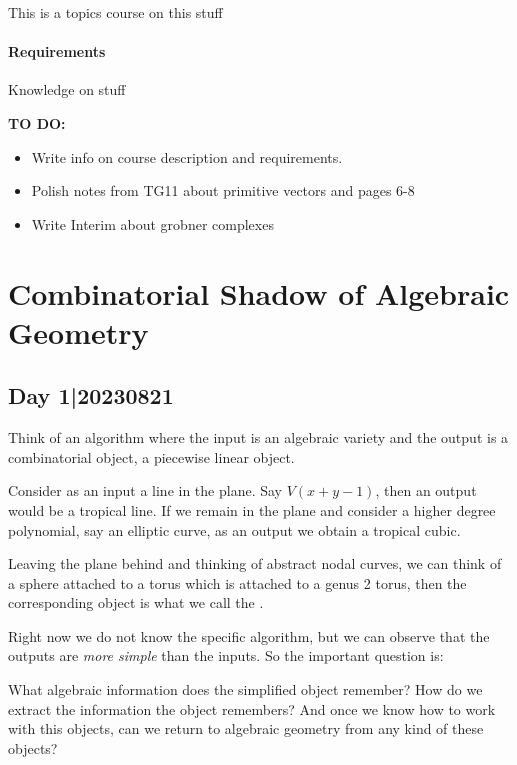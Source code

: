\documentclass[12pt]{memoir}
\begin{document}
\maketitle
{\small 
\setlength{\parindent}{0em}
\setlength{\parskip}{1em}

This is a topics course on this stuff

\subsubsection*{Requirements}
Knowledge on stuff\par 

\textbf{TO DO:}
\begin{itemize}
    \item Write info on course description and requirements.
    \item Polish notes from TG11 about primitive vectors and pages 6-8
    \item Write Interim about grobner complexes
\end{itemize}
}
\newpage
\tableofcontents
\chapter{Combinatorial Shadow of Algebraic Geometry}

\section{Day 1|20230821}

Think of an algorithm where the input is an algebraic variety and the output is a combinatorial object, a piecewise linear object.

\begin{Ex}
    Consider as an input a line in the plane. Say $V(x+y-1)$, then an output would be a tropical line. If we remain in the plane and consider a higher degree polynomial, say an elliptic curve, as an output we obtain a tropical cubic.\par 
    Leaving the plane behind and thinking of abstract nodal curves, we can think of a sphere attached to a torus which is attached to a genus 2 torus, then the corresponding object is what we call the .
\end{Ex}

Right now we do not know the specific algorithm, but we can observe that the outputs are \emph{more simple} than the inputs. So the important question is:
\begin{significant}
What algebraic information does the simplified object remember? How do we extract the information the object remembers? And once we know how to work with this objects, can we return to algebraic geometry from any kind of these objects?
\end{significant}
\end{document}
